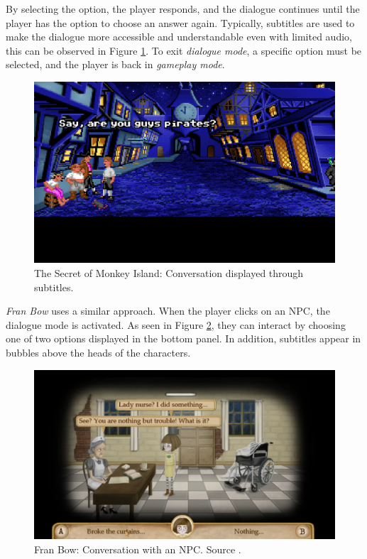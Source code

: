By selecting the option, the player responds, and the dialogue continues until the player has the option to choose an answer again. Typically, subtitles are used to make the dialogue more accessible and understandable even with limited audio, this can be observed in Figure \ref{fig:D-TSoMI2}. To exit \textit{dialogue mode}, a specific option must be selected, and the player is back in \textit{gameplay mode}.

\begin{figure}[H]
\centering
\includegraphics[width=.8\linewidth]{img/D-TSoMI2.png}
\caption{The Secret of Monkey Island: Conversation displayed through subtitles.}
\label{fig:D-TSoMI2}
\end{figure}

\textit{Fran Bow} uses a similar approach. When the player clicks on an NPC, the dialogue mode is activated. As seen in Figure \ref{fig:D-FranBow}, they can interact by choosing one of two options displayed in the bottom panel. In addition, subtitles appear in bubbles above the heads of the characters. 

\begin{figure}[H]
\centering
\includegraphics[width=.8\linewidth]{img/D-FB.png}
\caption{Fran Bow: Conversation with an NPC. Source \cite{FranBow}.}
\label{fig:D-FranBow}
\end{figure}


